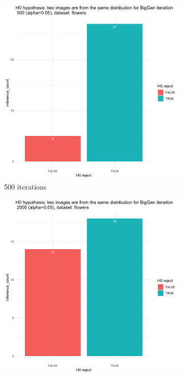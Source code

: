 \documentclass{article}
\begin{document}
\begin{figure}[h!]
    \caption{Dataset Flower}
     \centering
     \begin{subfigure}[b]{0.3\textwidth}
         \centering
         \includegraphics[width=\textwidth]{kmmd_figures/biggan_flower_500.png}
         \caption{500 iterations}
     \end{subfigure}
     \hfill
     \begin{subfigure}[b]{0.3\textwidth}
         \centering
         \includegraphics[width=\textwidth]{kmmd_figures/biggan_flower_2000.png}

\end{subfigure}
\end{figure}
\end{document}
